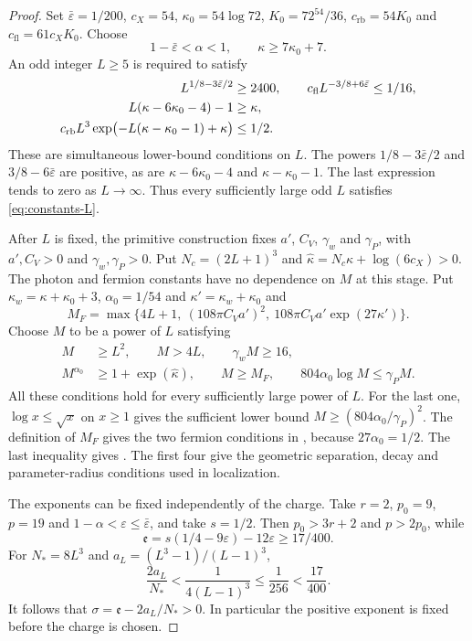 \begin{proof} Set $\bar\varepsilon=1/200$, $c_X=54$,
$\kappa_0=54\log72$, $K_0=72^{54}/36$,
$c_{\mathrm{rb}}=54K_0$ and $c_{\mathrm{fl}}=61c_XK_0$.
Choose
\[
 1-\bar\varepsilon<\alpha<1,\qquad
 \kappa\ge7\kappa_0+7.
\]
An odd integer $L\ge5$ is required to satisfy
\begin{align}
 L^{1/8-3\bar\varepsilon/2}&\ge2400,\qquad
 c_{\mathrm{fl}}L^{-3/8+6\bar\varepsilon}\le1/16,\notag\\
 L(\kappa-6\kappa_0-4)-1&\ge\kappa,\notag\\
 c_{\mathrm{rb}}L^3
       \exp\bigl(-L(\kappa-\kappa_0-1)+\kappa\bigr)
                                                   &\le1/2.
                                      \label{eq:constants-L}
\end{align}
These are simultaneous lower-bound conditions on $L$.
The powers $1/8-3\bar\varepsilon/2$ and
$3/8-6\bar\varepsilon$ are positive, as are
$\kappa-6\kappa_0-4$ and $\kappa-\kappa_0-1$.
The last expression tends to zero as $L\to\infty$.
Thus every sufficiently large odd $L$ satisfies
\eqref{eq:constants-L}.

After $L$ is fixed, the primitive construction fixes
$a'$, $C_V$, $\gamma_w$ and $\gamma_P$, with $a',C_V>0$
and $\gamma_w,\gamma_P>0$. Put
$N_c=(2L+1)^3$ and
$\widehat\kappa=N_c\kappa+\log(6c_X)>0$.
The photon and fermion
constants have no dependence on $M$ at this stage.
Put $\kappa_w=\kappa+\kappa_0+3$, $\alpha_0=1/54$ and $\kappa'=\kappa_w+\kappa_0$ and
\[
 M_F=\max\{4L+1,\ (108\pi C_Va')^2,\
                         108\pi C_Va'\exp(27\kappa')\}.
\]
Choose $M$ to be a power of $L$ satisfying
\begin{equation}\label{eq:constants-M}
 \begin{split}
 M&\ge L^2,\qquad M>4L,\qquad \gamma_wM\ge16,\\
 M^{\alpha_0}&\ge1+\exp(\widehat\kappa),\qquad
 M\ge M_F,\qquad 804\alpha_0\log M\le\gamma_PM.
 \end{split}
\end{equation}
All these conditions hold for every sufficiently large
power of $L$. For the last one, $\log x\le\sqrt x$
on $x\ge1$ gives the sufficient lower bound
$M\ge(804\alpha_0/\gamma_P)^2$.
The definition of $M_F$ gives the two fermion
conditions in ,
because $27\alpha_0=1/2$.
The last inequality gives .
The first four give the geometric separation, decay
and parameter-radius conditions used in localization.

The exponents can be fixed independently of the charge.
Take $r=2$, $p_0=9$, $p=19$ and
$1-\alpha<\varepsilon\le\bar\varepsilon$, and take $s=1/2$.
Then $p_0>3r+2$ and $p>2p_0$, while
\[
 \mathfrak e=s(1/4-9\varepsilon)-12\varepsilon
                      \ge17/400.
\]
For $N_*=8L^3$ and $a_L=(L^3-1)/(L-1)^3$,
\[
 \frac{2a_L}{N_*}
     <\frac1{4(L-1)^3}\le\frac1{256}<\frac{17}{400}.
\]
It follows that $\sigma=\mathfrak e-2a_L/N_*>0$.
In particular the positive exponent is fixed before
the charge is chosen.


\end{proof}
